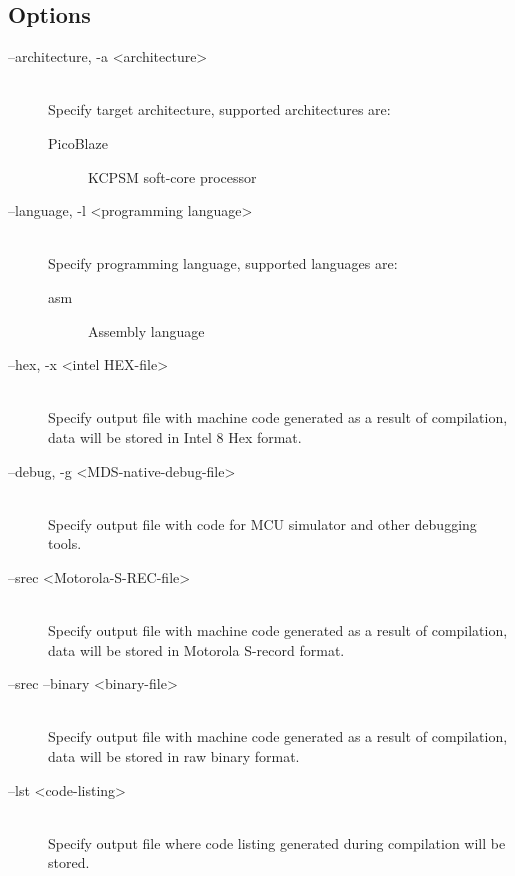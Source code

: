     \subsection{Options}
        \begin{description}
            \item[--architecture, -a <architecture>]~\\
                Specify target architecture, supported architectures are:
                \begin{description}
                    \item[PicoBlaze] KCPSM soft-core processor
                \end{description}

            \item[--language, -l <programming language>]~\\
                Specify programming language, supported languages are:
                \begin{description}
                    \item[asm] Assembly language
                \end{description}

            \item[--hex, -x <intel HEX-file>]~\\
                Specify output file with machine code generated as a result of compilation, data will be stored in Intel 8 Hex format.

            \item[--debug, -g <MDS-native-debug-file>]~\\
                Specify output file with code for MCU simulator and other debugging tools.

            \item[--srec <Motorola-S-REC-file>]~\\
                Specify output file with machine code generated as a result of compilation, data will be stored in Motorola S-record format.

            \item[--srec --binary <binary-file>]~\\
                Specify output file with machine code generated as a result of compilation, data will be stored in raw binary format.

            \item[--lst <code-listing>]~\\
                Specify output file where code listing generated during compilation will be stored.


\end{description}

